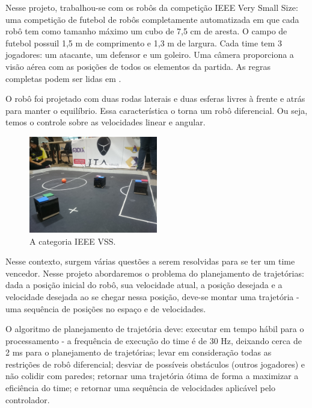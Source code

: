 \documentclass[a4paper,12pt]{article}
\begin{document}
Nesse projeto, trabalhou-se com os robôs da competição IEEE Very Small Size: uma competição de futebol de robôs completamente automatizada em que cada robô tem como tamanho máximo um cubo de 7,5 cm de aresta. O campo de futebol possuil 1,5 m de comprimento e 1,3 m de largura. Cada time tem 3 jogadores: um atacante, um defensor e um goleiro. Uma câmera proporciona a visão aérea com as posições de todos os elementos da partida. As regras completas podem ser lidas em \cite{cbr2008}. 

O robô foi projetado com duas rodas laterais e duas esferas livres à frente e atrás para manter o equilíbrio. Essa característica o torna um robô diferencial. Ou seja, temos o controle sobre as velocidades linear e angular.

\begin{figure}
	\label{fig: vss}
	\centering
	\includegraphics[width=0.5\textwidth]{figures/vss.JPG}
   \caption{A categoria IEEE VSS.}
\end{figure}

Nesse contexto, surgem várias questões a serem resolvidas para se ter um time vencedor. Nesse projeto abordaremos o problema do planejamento de trajetórias: dada a posição inicial do robô, sua velocidade atual, a posição desejada e a velocidade desejada ao se chegar nessa posição, deve-se montar uma trajetória - uma sequência de posições no espaço e de velocidades.

O algoritmo de planejamento de trajetória deve: executar em tempo hábil para o processamento - a frequência de execução do time é de 30 Hz, deixando cerca de 2 ms para o planejamento de trajetórias; levar em consideração todas as restrições de robô diferencial; desviar de possíveis obstáculos (outros jogadores) e não colidir com paredes; retornar uma trajetória ótima de forma a maximizar a eficiência do time; e retornar uma sequência de velocidades aplicável pelo controlador.

\end{document}
